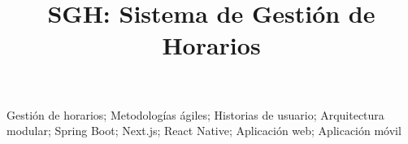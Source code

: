 \documentclass[conference]{IEEEtran}
\begin{document}
\title{SGH: Sistema de Gestión de Horarios}

\author{
\and
{}
}

\maketitle

\begin{abstract}

\end{abstract}

\begin{IEEEkeywords}
Gestión de horarios; Metodologías ágiles; Historias de usuario; Arquitectura modular; Spring Boot; Next.js; React Native; Aplicación web; Aplicación móvil
\end{IEEEkeywords}










\printbibliography
\end{document}
